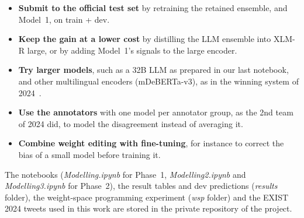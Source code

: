 \documentclass[pdflatex,sn-mathphys-num]{sn-jnl}
\begin{document}
\begin{itemize}
\item \textbf{Submit to the official test set} by retraining the retained ensemble, and Model~1, on train + dev.
\item \textbf{Keep the gain at a lower cost} by distilling the LLM ensemble into XLM-R large, or by adding Model~1's signals to the large encoder.
\item \textbf{Try larger models}, such as a 32B LLM as prepared in our last notebook, and other multilingual encoders (mDeBERTa-v3), as in the winning system of 2024~\cite{fang2024nycu}.
\item \textbf{Use the annotators} with one model per annotator group, as the 2nd team of 2024 did, to model the disagreement instead of averaging it.
\item \textbf{Combine weight editing with fine-tuning}, for instance to correct the bias of a small model before training it.
\end{itemize}

\backmatter

The notebooks (\emph{Modelling.ipynb} for Phase~1, \emph{Modelling2.ipynb} and \emph{Modelling3.ipynb} for Phase~2), the result tables and dev predictions (\emph{results} folder), the weight-space programming experiment (\emph{wsp} folder) and the EXIST 2024 tweets used in this work are stored in the private repository of the project.


\end{document}
